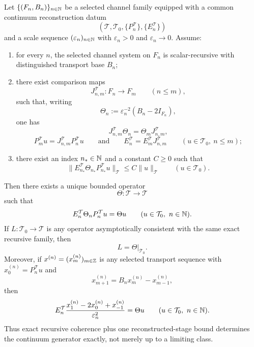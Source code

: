 \begin{theorem}
\label{thm:one-stage-bounded-exact-scalar-recursion-forces-generator}
Let \(\{(F_n,B_n)\}_{n\in\mathbb{N}}\) be a selected channel family equipped with a
common continuum reconstruction datum
\[
(\mathcal T,\mathcal T_0,\{P_n^{\mathcal T}\},\{E_n^{\mathcal T}\})
\]
and a scale sequence \((\varepsilon_n)_{n\in\mathbb{N}}\) with
\(\varepsilon_n>0\) and \(\varepsilon_n\to 0\). Assume:
\begin{enumerate}[label=(\roman*), leftmargin=2em, itemsep=0.2em]
\item for every \(n\), the selected channel system on \(F_n\) is
      scalar-recursive with distinguished transport base \(B_n\);
\item there exist comparison maps
      \[
      J^{\mathcal T}_{n,m}:F_n\to F_m
      \qquad (n\le m),
      \]
      such that, writing
      \[
      \Theta_n:=\varepsilon_n^{-2}(B_n-2I_{F_n}),
      \]
      one has
      \[
      J^{\mathcal T}_{n,m}\Theta_n=\Theta_mJ^{\mathcal T}_{n,m},
      \]
      \[
      P_m^{\mathcal T}u=J^{\mathcal T}_{n,m}P_n^{\mathcal T}u
      \qquad\text{and}\qquad
      E_n^{\mathcal T}=E_m^{\mathcal T}J^{\mathcal T}_{n,m}
      \qquad (u\in\mathcal T_0,\ n\le m);
      \]
\item there exist an index \(n_\ast\in\mathbb{N}\) and a constant \(C\ge 0\) such
      that
      \[
      \|E_{n_\ast}^{\mathcal T}\Theta_{n_\ast}P_{n_\ast}^{\mathcal T}u\|_{\mathcal T}
      \le
      C\|u\|_{\mathcal T}
      \qquad (u\in\mathcal T_0).
      \]
\end{enumerate}
Then there exists a unique bounded operator
\[
\Theta:\mathcal T\to\mathcal T
\]
such that
\[
E_n^{\mathcal T}\Theta_nP_n^{\mathcal T}u=\Theta u
\qquad (u\in\mathcal T_0,\ n\in\mathbb{N}).
\]
If \(L:\mathcal T_0\to\mathcal T\) is any operator asymptotically consistent
with the same exact recursive family, then
\[
L=\Theta|_{\mathcal T_0}.
\]
Moreover, if \(x^{(n)}=(x_m^{(n)})_{m\in\mathbb{Z}}\) is any selected transport
sequence with \(x_0^{(n)}=P_n^{\mathcal T}u\) and
\[
x_{m+1}^{(n)}=B_nx_m^{(n)}-x_{m-1}^{(n)},
\]
then
\[
E_n^{\mathcal T}\frac{x_1^{(n)}-2x_0^{(n)}+x_{-1}^{(n)}}{\varepsilon_n^2}
=
\Theta u
\qquad (u\in\mathcal T_0,\ n\in\mathbb{N}).
\]
Thus exact recursive coherence plus one reconstructed-stage bound determines
the continuum generator exactly, not merely up to a limiting class.
\end{theorem}

